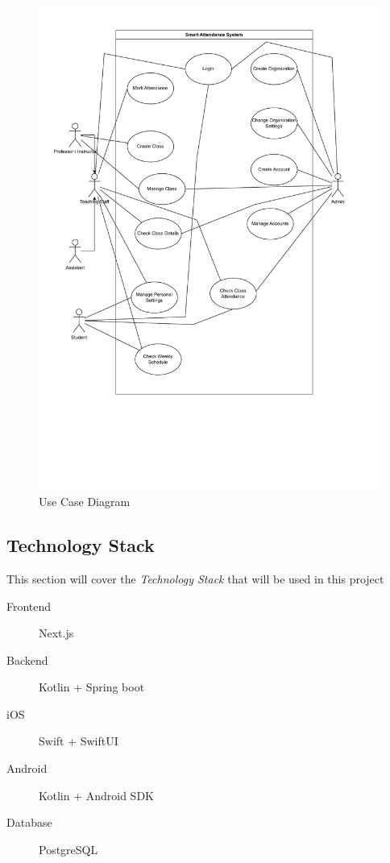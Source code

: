 \documentclass[a4paper, 12pt]{article}
\begin{document}
      \begin{figure}[h]
        \centering
        \includegraphics[width=\textwidth, trim={0 80 0 120}, clip]{use_case_diagram.pdf}

        \caption{Use Case Diagram}
        \label{fig: use_case_diagram}
      \end{figure}

      \newpage

  \subsection{Technology Stack}
      \noindent This section will cover the \emph{Technology Stack} that will be used in this project
      \vspace{2mm}

      \begin{description}
        \item[Frontend] Next.js
        \item[Backend] Kotlin + Spring boot
        \item[iOS] Swift + SwiftUI
        \item[Android] Kotlin + Android SDK
        \item[Database] PostgreSQL
      \end{description}
\end{document}

